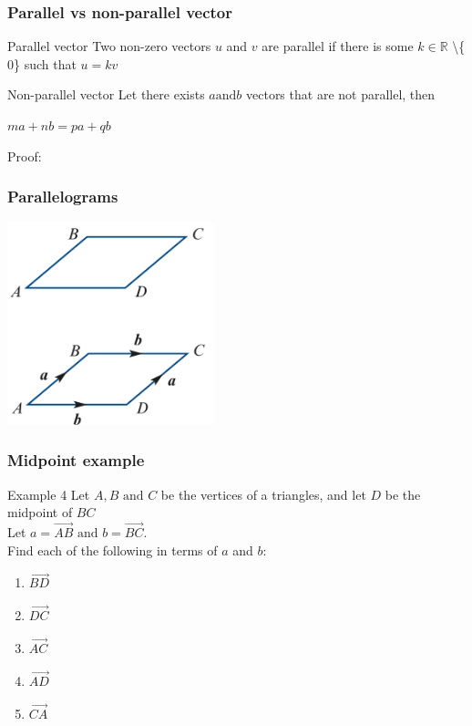 \documentclass[
	11pt, %
]{beamer}
\newcommand{\blank}{\begin{frame}\end{frame}}
\begin{document}
\begin{frame}[t]
    \frametitle{Parallel vs non-parallel vector}
    \begin{block}{Parallel vector}
        Two non-zero vectors $u$ and $v$ are parallel if there is some $k\in \mathbb{R}$ \textbackslash \{$0$\} such that $u = kv$
    \end{block}
    \begin{block}{Non-parallel vector}
        Let there exists $a \text{and} b$ vectors that are not parallel, then\\
        \begin{center}
            $ma + nb = pa + qb$
        \end{center}        
    \end{block}
    Proof:
\end{frame}
\blank

\begin{frame}
    \frametitle{Parallelograms}
    \includegraphics[width = 6cm]{Parallel.png}
\end{frame}

\begin{frame}[t]
    \frametitle{Midpoint example}
    \begin{block}{Example 4}
        Let $A, B \text{ and } C$ be the vertices of a triangles, and let $D$ be the midpoint of $BC$\\
        Let $a = \vec{AB} \text{ and } b = \vec{BC}.$\\
        Find each of the following in terms of $a$ and $b$:\\
        \begin{enumerate}
            \item $\vec{BD}$
            \item $\vec{DC}$
            \item $\vec{AC}$
            \item $\vec{AD}$
            \item $\vec{CA}$
        \end{enumerate}
    \end{block}
\end{frame}
\blank
\end{document}
